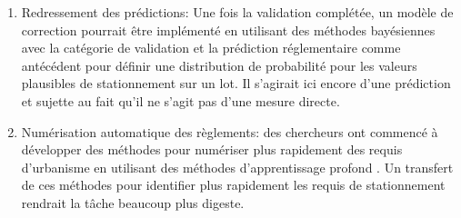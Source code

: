 \begin{enumerate}
            \item Redressement des prédictions: Une fois la validation complétée, un modèle de correction pourrait être implémenté en utilisant des méthodes bayésiennes avec la catégorie de validation et la prédiction réglementaire comme antécédent pour définir une distribution de probabilité pour les valeurs plausibles de stationnement sur un lot. Il s'agirait ici encore d'une prédiction et sujette au fait qu'il ne s'agit pas d'une mesure directe.
            \item Numérisation automatique des règlements: des chercheurs ont commencé à développer des méthodes pour numériser plus rapidement des requis d'urbanisme en utilisant des méthodes d'apprentissage profond \parencite{axelrod_automating_2023}. Un transfert de ces méthodes pour identifier plus rapidement les requis de stationnement rendrait la tâche beaucoup plus digeste.
        \end{enumerate}

    
    

